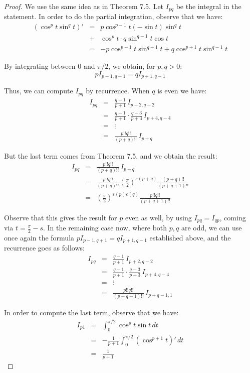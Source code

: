 \documentclass[12pt]{amsbook}
\begin{document}
\begin{proof}
We use the same idea as in Theorem 7.5. Let $I_{pq}$ be the integral in the statement. In order to do the partial integration, observe that we have:
\begin{eqnarray*}
(\cos^pt\sin^qt)'
&=&p\cos^{p-1}t(-\sin t)\sin^qt\\
&+&\cos^pt\cdot q\sin^{q-1}t\cos t\\
&=&-p\cos^{p-1}t\sin^{q+1}t+q\cos^{p+1}t\sin^{q-1}t
\end{eqnarray*}

By integrating between $0$ and $\pi/2$, we obtain, for $p,q>0$:
$$pI_{p-1,q+1}=qI_{p+1,q-1}$$

Thus, we can compute $I_{pq}$ by recurrence. When $q$ is even we have:
\begin{eqnarray*}
I_{pq}
&=&\frac{q-1}{p+1}\,I_{p+2,q-2}\\
&=&\frac{q-1}{p+1}\cdot\frac{q-3}{p+3}\,I_{p+4,q-4}\\
&=&\vdots\\
&=&\frac{p!!q!!}{(p+q)!!}\,I_{p+q}
\end{eqnarray*}

But the last term comes from Theorem 7.5, and we obtain the result:
\begin{eqnarray*}
I_{pq}
&=&\frac{p!!q!!}{(p+q)!!}\,I_{p+q}\\
&=&\frac{p!!q!!}{(p+q)!!}\left(\frac{\pi}{2}\right)^{\varepsilon(p+q)}\frac{(p+q)!!}{(p+q+1)!!}\\
&=&\left(\frac{\pi}{2}\right)^{\varepsilon(p)\varepsilon(q)}\frac{p!!q!!}{(p+q+1)!!}
\end{eqnarray*}

Observe that this gives the result for $p$ even as well, by using $I_{pq}=I_{qp}$, coming via $t=\frac{\pi}{2}-s$. In the remaining case now, where both $p,q$ are odd, we can use once again the formula $pI_{p-1,q+1}=qI_{p+1,q-1}$ established above, and the recurrence goes as follows:
\begin{eqnarray*}
I_{pq}
&=&\frac{q-1}{p+1}\,I_{p+2,q-2}\\
&=&\frac{q-1}{p+1}\cdot\frac{q-3}{p+3}\,I_{p+4,q-4}\\
&=&\vdots\\
&=&\frac{p!!q!!}{(p+q-1)!!}\,I_{p+q-1,1}
\end{eqnarray*}

In order to compute the last term, observe that we have:
\begin{eqnarray*}
I_{p1}
&=&\int_0^{\pi/2}\cos^pt\sin t\,dt\\
&=&-\frac{1}{p+1}\int_0^{\pi/2}(\cos^{p+1}t)'\,dt\\
&=&\frac{1}{p+1}
\end{eqnarray*}


\end{proof}
\end{document}
